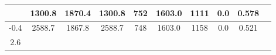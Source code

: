 \documentclass[a4paper,12pt]{article}
\begin{document}
\begin{longtable}{
     |
%    
    c|
%    
    c|
%    
    c|
%    
    c|
%    
    c|
%    
    c|
%    
    c|
%    
    c|
%    
    c|
%    
    c|
%    
    }
%        
        & 1300.8
%        

%        

%        
        & 1870.4
%        

%        

%        
        & 1300.8
%        

%        

%        
        & 752
%        

%        

%        
        & 1603.0
%        

%        

%        
        & 1111
%        

%        

%        
        & 0.0
%        

%        

%        
        & 0.578
%        

%        
        \\
        \hline

        

%        

%        
        -0.4
%        

%        

%        
        & 2588.7
%        

%        

%        
        & 1867.8
%        

%        

%        
        & 2588.7
%        

%        

%        
        & 748
%        

%        

%        
        & 1603.0
%        

%        

%        
        & 1158
%        

%        

%        
        & 0.0
%        

%        

%        
        & 0.521
%        

%        
        \\
        \hline

        

%        

%        
        2.6
%        

%        


\end{longtable}
\end{document}
